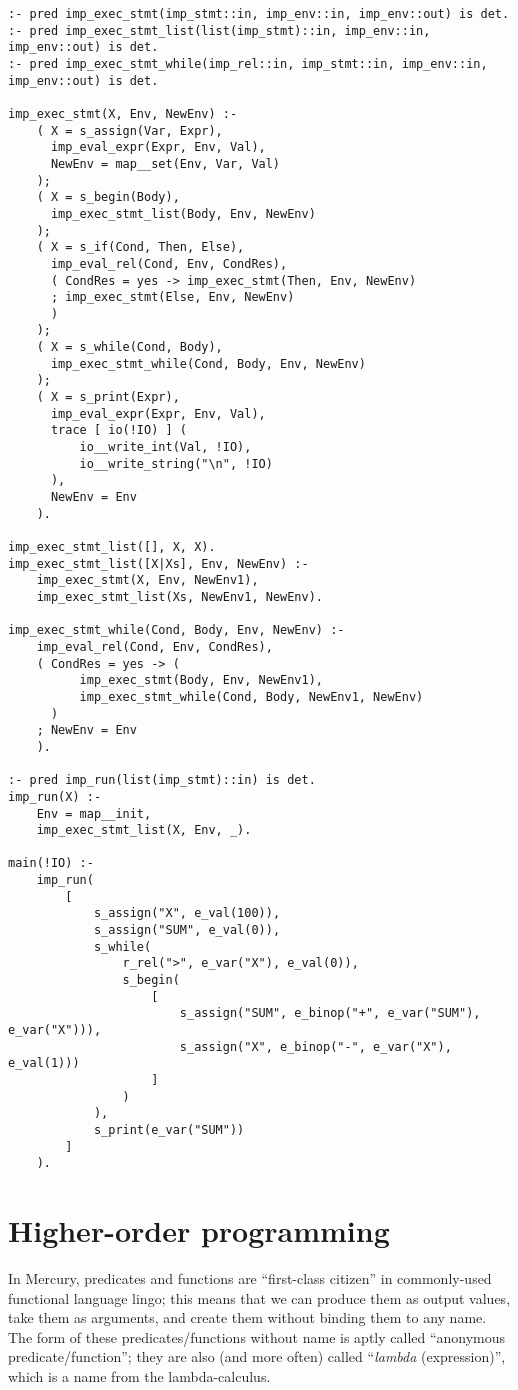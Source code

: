\begin{lstlisting}[language=Mercury]
:- pred imp_exec_stmt(imp_stmt::in, imp_env::in, imp_env::out) is det.
:- pred imp_exec_stmt_list(list(imp_stmt)::in, imp_env::in, imp_env::out) is det.
:- pred imp_exec_stmt_while(imp_rel::in, imp_stmt::in, imp_env::in, imp_env::out) is det.

imp_exec_stmt(X, Env, NewEnv) :-
	( X = s_assign(Var, Expr),
	  imp_eval_expr(Expr, Env, Val),
	  NewEnv = map__set(Env, Var, Val)
	);
	( X = s_begin(Body),
	  imp_exec_stmt_list(Body, Env, NewEnv)
	);
	( X = s_if(Cond, Then, Else),
	  imp_eval_rel(Cond, Env, CondRes),
	  ( CondRes = yes -> imp_exec_stmt(Then, Env, NewEnv)
	  ; imp_exec_stmt(Else, Env, NewEnv)
	  )
	);
	( X = s_while(Cond, Body),
	  imp_exec_stmt_while(Cond, Body, Env, NewEnv)
	);
	( X = s_print(Expr),
	  imp_eval_expr(Expr, Env, Val),
	  trace [ io(!IO) ] (
		  io__write_int(Val, !IO),
		  io__write_string("\n", !IO)
	  ),
	  NewEnv = Env
	).

imp_exec_stmt_list([], X, X).
imp_exec_stmt_list([X|Xs], Env, NewEnv) :-
	imp_exec_stmt(X, Env, NewEnv1),
	imp_exec_stmt_list(Xs, NewEnv1, NewEnv).

imp_exec_stmt_while(Cond, Body, Env, NewEnv) :-
	imp_eval_rel(Cond, Env, CondRes),
	( CondRes = yes -> (
		  imp_exec_stmt(Body, Env, NewEnv1),
		  imp_exec_stmt_while(Cond, Body, NewEnv1, NewEnv)
	  )
	; NewEnv = Env
	).

:- pred imp_run(list(imp_stmt)::in) is det.
imp_run(X) :-
	Env = map__init,
	imp_exec_stmt_list(X, Env, _).
	
main(!IO) :-
	imp_run(
		[
			s_assign("X", e_val(100)),
			s_assign("SUM", e_val(0)),
			s_while(
				r_rel(">", e_var("X"), e_val(0)),
				s_begin(
					[
						s_assign("SUM", e_binop("+", e_var("SUM"), e_var("X"))),
						s_assign("X", e_binop("-", e_var("X"), e_val(1)))
					]
				)
			),
			s_print(e_var("SUM"))
		]
	).
\end{lstlisting}

\section{Higher-order programming}

In Mercury, predicates and functions are ``first-class citizen'' in commonly-used functional language lingo; this means that we can produce them as output values, take them as arguments, and create them without binding them to any name. The form of these predicates/functions without name is aptly called ``anonymous predicate/function''; they are also (and more often) called ``\textit{lambda} (expression)'', which is a name from the lambda-calculus.

